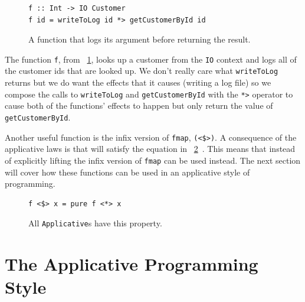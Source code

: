 \begin{figure}[t]
\begin{lstlisting}
f :: Int -> IO Customer
f id = writeToLog id *> getCustomerById id
\end{lstlisting}
\caption{A function that logs its argument before returning the result.}
\label{logApp}
\end{figure}

The function \texttt{f}, from \DIFdelbegin {}\DIFdelend \DIFaddbegin {}\DIFaddend ~\ref{logApp}, looks up a customer \DIFdelbegin {}\DIFdelend \DIFaddbegin {}\DIFaddend from the \texttt{IO} context and logs all of the customer ids that are looked up. We don't really care what \texttt{writeToLog} returns but we do want the effects that it causes (writing a log file) so we compose the calls to \texttt{writeToLog} and \texttt{getCustomerById} with the \texttt{*>} operator to cause both of the functions' effects to happen but only return the value of \texttt{getCustomerById}.

Another useful function is the infix version of \texttt{fmap}, \texttt{(<\$>)}. A consequence of the applicative laws is that \DIFdelbegin {}\DIFdelend \DIFaddbegin {}\texttt{} \DIFaddend will satisfy the equation in  \DIFdelbegin {}\DIFdelend \DIFaddbegin {}\DIFaddend ~\ref{fmapLaw}~\DIFdelbegin {}\DIFdelend \DIFaddbegin {}\DIFaddend . This means that instead of explicitly lifting \DIFdelbegin {}\DIFdelend \DIFaddbegin {}\DIFaddend the infix version of \texttt{fmap} can be used instead. The next section will cover how these functions can be used in an applicative style of programming.

\begin{figure}[t]
\begin{lstlisting}
f <$> x = pure f <*> x
\end{lstlisting}
\caption{All \texttt{Applicative}s have this property.}
\label{fmapLaw}
\end{figure}

 


\section{The Applicative Programming Style}
\label{sec:appProgStyle}

